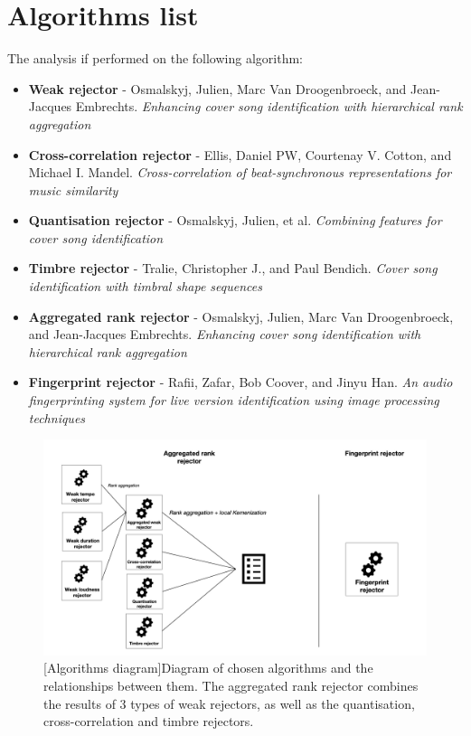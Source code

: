 \section{Algorithms list}
\label{sec:algolist}
The analysis if performed on the following algorithm:
\begin{itemize}
    \item \textbf{Weak rejector} - Osmalskyj, Julien, Marc Van Droogenbroeck,
    and Jean-Jacques Embrechts. \textit{Enhancing cover song identification with
    hierarchical rank aggregation} \cite{osmalsky2016enhancing}
    \item \textbf{Cross-correlation rejector} - Ellis, Daniel PW, Courtenay V.
    Cotton, and Michael I. Mandel. \textit{Cross-correlation of beat-synchronous
    representations for music similarity} \cite{ellis2008cross}
    \item \textbf{Quantisation rejector} - Osmalskyj, Julien, et al.
    \textit{Combining features for cover song identification} \cite{osmalsky2015combining}
    \item \textbf{Timbre rejector} - Tralie, Christopher J., and Paul Bendich.
    \textit{Cover song identification with timbral shape sequences} \cite{tralie2015cover}
    \item \textbf{Aggregated rank rejector} - Osmalskyj, Julien, Marc Van
    Droogenbroeck, and Jean-Jacques Embrechts. \textit{Enhancing cover song
    identification with hierarchical rank aggregation}
    \cite{osmalsky2016enhancing} 
    \item \textbf{Fingerprint rejector} - Rafii, Zafar, Bob Coover, and Jinyu
    Han. \textit{An audio fingerprinting system for live version identification
    using image processing techniques} \cite{rafii2014audio}
\end{itemize}

\begin{figure}[H]
    \centering
    \includegraphics[width=\textwidth]{Algorithms/algorithm_diagram_3.jpg}
    [Algorithms diagram]{Diagram of chosen algorithms and the relationships between them. The aggregated rank rejector combines the results of 3 types of weak rejectors, as well as the quantisation, cross-correlation and timbre rejectors.}
    \label{fig:algorithms}
\end{figure}

